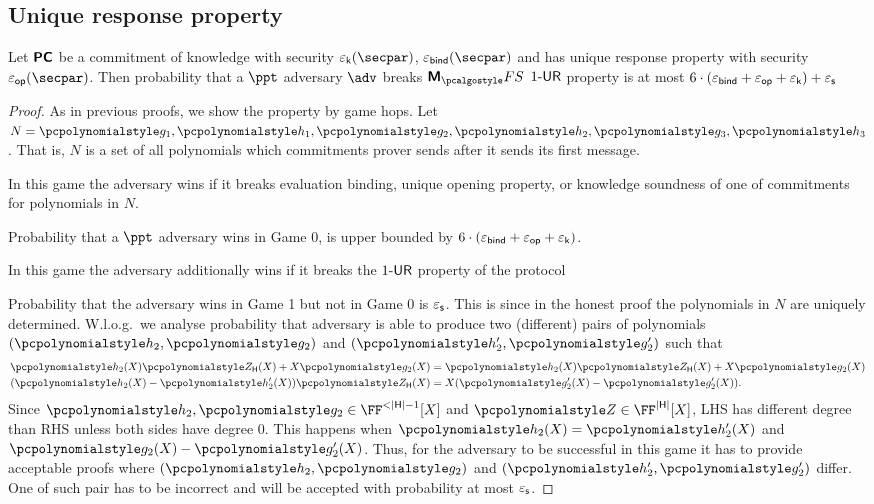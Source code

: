 \subsection{Unique response property}
\begin{lemma}\label{lem:marlinprot_ur}
  Let $\bm{\mathsf{PC}}$ be a commitment of knowledge with security $\epsk(\secpar)$,
  $\epsbind(\secpar)$ and has unique response property with security
  $\epsop(\secpar)$. Then probability that a $\ppt$ adversary $\adv$ breaks
  $\marlinprotfs$ ${1\text{-}\mathsf{UR}}$ property is at most
  $6 \cdot (\varepsilon_{\mathsf{bind}} + \varepsilon_{\mathsf{op}} + \varepsilon_{\mathsf{k}}) + \varepsilon_{\mathsf{s}}$
\end{lemma}
\begin{proof}
  As in previous proofs, we show the property by game hops. Let
  $N = \p{g_1}, \p{h_1}, \p{g_2}, \p{h_2}, \p{g_3}, \p{h_3}$. That is, $N$ is a
  set of all polynomials which commitments prover sends after it sends its first message.

   In this game the adversary wins if it breaks evaluation
  binding, unique opening property, or knowledge soundness of one of commitments
  for polynomials in $N$.

  Probability that a $\ppt$ adversary wins in Game 0, is upper bounded by $6
  \cdot (\varepsilon_{\mathsf{bind}} + \varepsilon_{\mathsf{op}} + \varepsilon_{\mathsf{k}})$.

   In this game the adversary additionally wins if it breaks the
  ${1\text{-}\mathsf{UR}}$ property of the protocol

   Probability that the adversary wins in Game 1 but not in Game 0
  is $\varepsilon_{\mathsf{s}}$. This is since in the honest proof the polynomials in $N$ are uniquely
  determined. W.l.o.g.~we analyse probability that adversary is able to produce two
  (different) pairs of polynomials $(\p{h_2}, \p{g_2})$ and $(\p{h'_2}, \p{g'_2})$ such
  that
  \begin{align*}
    \p{h_2} (X) \ZERO_{\HHH} (X) + X \p{g_2} (X) & = \p{h_2} (X) \ZERO_{\HHH} (X) +
                                                   X \p{g_2} (X)\\
    (\p{h_2} (X) - \p{h'_2} (X)) \ZERO_{\HHH} (X) & = X (\p{g'_2} (X) - \p{g'_2}
    (X)).
  \end{align*}
  Since $\p{h_2}, \p{g_2} \in \FF^{< |\HHH| - 1} [X]$ and
  $\ZERO \in \FF^{|\HHH|} [X]$, LHS has different degree than RHS unless both
  sides have degree $0$. This happens when $\p{h_2} (X) = \p{h'_2} (X)$ and
  $\p{g_2} (X) - \p{g'_2} (X)$.
  Thus, for the adversary to be successful in this game it has to provide acceptable
  proofs where $(\p{h_2}, \p{g_2})$ and $(\p{h'_2}, \p{g'_2})$ differ. One of such pair
  has to be incorrect and will be accepted with probability at most $\varepsilon_{\mathsf{s}}$.
\end{proof}

